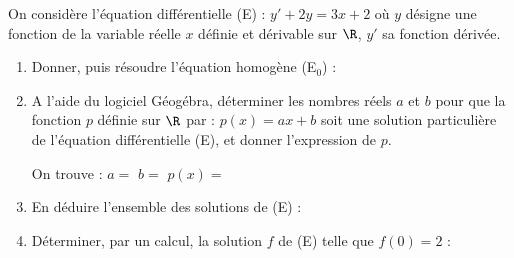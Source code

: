 On considère l’équation différentielle (E) : $y' + 2y = 3x+2$ où $y$ désigne une fonction de la variable réelle $x$ définie et dérivable sur $\R$, $y'$ sa fonction dérivée.

\begin{enumerate}
	\item Donner, puis résoudre l'équation homogène (E$_0$) :\sautp

	\item A l’aide du logiciel Géogébra, déterminer les nombres réels $a$ et $b$ pour que la fonction $p$ définie sur $\R$ par : $p(x) = ax+b$ soit une solution particulière de l'équation différentielle (E), et donner l’expression de $p$. 

	
	On trouve : \hfill $a=$\makebox[0.1\linewidth]{\dotfill} \hfill $b=$\makebox[0.1\linewidth]{\dotfill} \hfill $p(x)=$\makebox[0.3\linewidth]{\dotfill}

	\smallskip
	
	\appelprof
	
	\item En déduire l'ensemble des solutions de (E) : \sautp

	\item Déterminer, par un calcul, la solution $f$ de (E) telle que $f(0)=2$ : \sautp


\end{enumerate}